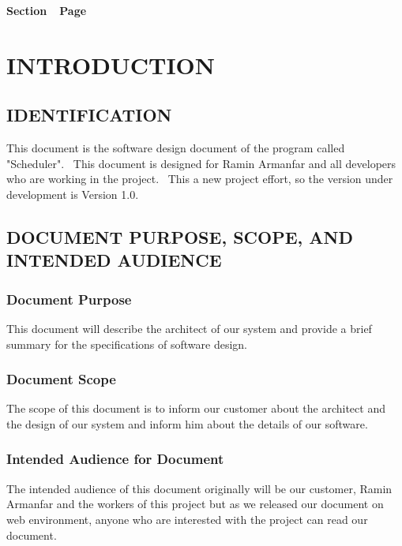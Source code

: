 \documentclass[twoside,letterpaper]{article}
\begin{document}
{\bfseries\color{black}
Section\ \ Page}

\setcounter{tocdepth}{9}
\renewcommand\contentsname{}
\tableofcontents

\bigskip

\bigskip
\clearpage\setcounter{page}{1}\pagestyle{Standard}
\section{INTRODUCTION}
\label{sec:intro}

\subsection{IDENTIFICATION}

This document is the software design document of the program called "Scheduler". \ This document is designed for Ramin Armanfar and all developers who are working in the project. \  This a new project effort, so the version under development is Version 1.0.

\subsection{DOCUMENT PURPOSE, SCOPE, AND INTENDED AUDIENCE}

\subsubsection{Document Purpose}

This document will describe the architect of our system and provide a brief summary for the specifications of software design.

\subsubsection{Document Scope}
The scope of this document is to inform our customer about the architect and the design of our system and inform him about the details of our software.

\subsubsection{Intended Audience for Document}

The intended audience of this document originally will be our customer, Ramin Armanfar and the workers of this project but as we released our document on web environment, anyone who are interested with the project can read our document.
\end{document}
